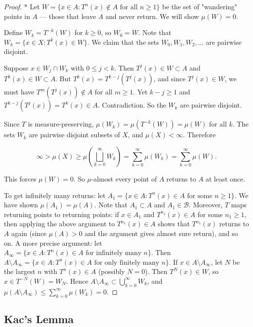 \begin{proof}
* Let $W = \{x \in A : T^n(x) \notin A \text{ for all } n \ge 1\}$ be the set of "wandering" points in $A$ --- those that leave $A$ and never return. We will show $\mu(W) = 0$.

Define $W_k = T^{-k}(W)$ for $k \ge 0$, so $W_0 = W$. Note that $W_k = \{x \in X : T^k(x) \in W\}$. We claim that the sets $W_0, W_1, W_2, \ldots$ are pairwise disjoint.

Suppose $x \in W_j \cap W_k$ with $0 \le j < k$. Then $T^j(x) \in W \subset A$ and $T^k(x) \in W \subset A$. But $T^k(x) = T^{k-j}(T^j(x))$, and since $T^j(x) \in W$, we must have $T^m(T^j(x)) \notin A$ for all $m \ge 1$. Yet $k - j \ge 1$ and $T^{k-j}(T^j(x)) = T^k(x) \in A$. Contradiction. So the $W_k$ are pairwise disjoint.

Since $T$ is measure-preserving, $\mu(W_k) = \mu(T^{-k}(W)) = \mu(W)$ for all $k$. The sets $W_k$ are pairwise disjoint subsets of $X$, and $\mu(X) < \infty$. Therefore

\[
\infty > \mu(X) \ge \mu\left(\bigsqcup_{k=0}^{\infty} W_k\right) = \sum_{k=0}^{\infty} \mu(W_k) = \sum_{k=0}^{\infty} \mu(W).
\]

This forces $\mu(W) = 0$. So $\mu$-almost every point of $A$ returns to $A$ at least once.

To get infinitely many returns: let $A_1 = \{x \in A : T^n(x) \in A \text{ for some } n \ge 1\}$. We have shown $\mu(A_1) = \mu(A)$. Note that $A_1 \subset A$ and $A_1 \in \mathcal{B}$. Moreover, $T$ maps returning points to returning points: if $x \in A_1$ and $T^{n_1}(x) \in A$ for some $n_1 \ge 1$, then applying the above argument to $T^{n_1}(x) \in A$ shows that $T^{n_1}(x)$ returns to $A$ again (since $\mu(A) > 0$ and the argument gives almost sure return), and so on. A more precise argument: let $A_\infty = \{x \in A : T^n(x) \in A \text{ for infinitely many } n\}$. Then $A \setminus A_\infty = \{x \in A : T^n(x) \in A \text{ for only finitely many } n\}$. If $x \in A \setminus A_\infty$, let $N$ be the largest $n$ with $T^n(x) \in A$ (possibly $N = 0$). Then $T^N(x) \in W$, so $x \in T^{-N}(W) = W_N$. Hence $A \setminus A_\infty \subset \bigcup_{k=0}^\infty W_k$, and $\mu(A \setminus A_\infty) \le \sum_{k=0}^\infty \mu(W_k) = 0$.
\end{proof}


\subsection{Kac's Lemma}\label{sec:8.5.2}

